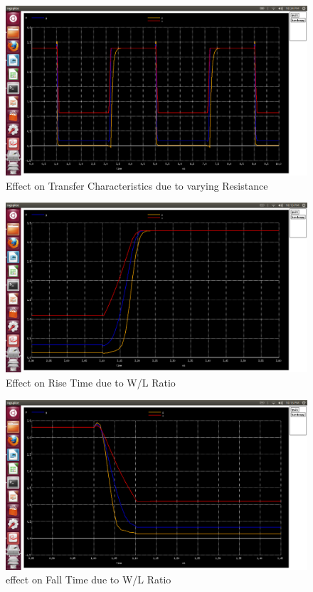 \documentclass[12pt,a4paper]{article}
\begin{document}
\begin{center}
\begin{figure}[!ht]
\centering
\includegraphics[scale=0.37]{lab2_pic25_effect_on_trenchar_dueto_varyR.png}
\caption[Short]{Effect on Transfer Characteristics due to varying Resistance}
\end{figure}
\clearpage

\begin{figure}[!ht]
\centering
\includegraphics[scale=0.37]{lab2_pic231_rise_time_due_to_WbyL_vary.png}
\caption[Short]{Effect on Rise Time due to W/L Ratio}
\end{figure}

\begin{figure}[!ht]
\centering
\includegraphics[scale=0.37]{lab2_pic232_fall_time_due_to_WbyL_vary.png}
\caption[Short]{effect on Fall Time due to W/L Ratio}
\end{figure}


\end{center}
\end{document}
